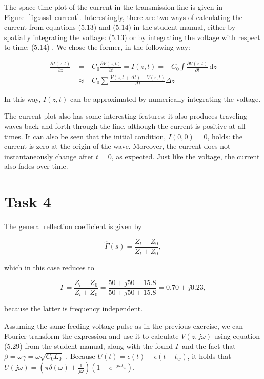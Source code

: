 \documentclass[11pt,titlepage]{report}
\begin{document}
The space-time plot of the current in the transmission line is given in Figure~\ref{fig:ass1-current}. Interestingly, there are two ways of calculating the current from equations (5.13) and (5.14) in the student manual, either by spatially integrating the voltage: (5.13) or by integrating the voltage with respect to time: (5.14) \cite[62]{epo4-manual}. We chose the former, in the following way:

\begin{align}
\frac{\partial I(z,t)}{\partial z} &= 
-C_0\frac{\partial V(z,t)}{\partial t} = I(z,t)=-C_0\int \! \frac{\partial V(z,t)}{\partial t}\, \mathrm{d}z \nonumber
\\
&\approx -C_0\sum\frac{V(z,t+\Delta t)-V(z,t)}{\Delta t}\Delta z
\end{align}

In this way, $I(z,t)$ can be approximated by numerically integrating the voltage. 

The current plot also has some interesting features: it also produces traveling waves back and forth through the line, although the current is positive at all times. It can also be seen that the initial condition, $I(0,0)=0$, holds: the current is zero at the origin of the wave. Moreover, the current does not instantaneously change after $t=0$, as expected. Just like the voltage, the current also fades over time.

\section{Task 4}
The general reflection coefficient is given by 

\begin{equation}
	\hat{\Gamma}(s)=\frac{Z_l-Z_0}{Z_l+Z_0},
\end{equation}

which in this case reduces to

\begin{equation}
	\Gamma = \frac{Z_l-Z_0}{Z_l+Z_0}=\frac{50+j50-15.8}{50+j50+15.8}=0.70+j0.23,
\end{equation}

because the latter is frequency independent.

Assuming the same feeding voltage pulse as in the previous exercise, we can Fourier transform the expression and use it to calculate $V(z,j\omega)$ using equation (5.29) from the student manual, along with the found $\Gamma$ and the fact that $\beta=\omega\gamma=\omega\sqrt{C_0L_0}$ \cite[63]{epo4-manual}. Because $U(t)=\epsilon(t)-\epsilon(t-t_w)$, it holds that $U(j\omega)=(\pi\delta(\omega)+\frac{1}{j\omega})(1-e^{-j\omega t_w})$.
\end{document}
